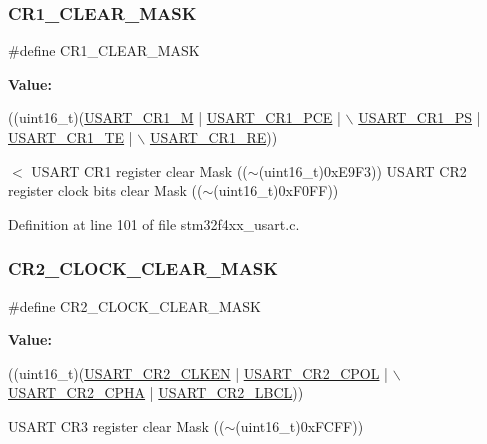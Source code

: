 \subsubsection{\texorpdfstring{C\+R1\+\_\+\+C\+L\+E\+A\+R\+\_\+\+M\+A\+SK}{CR1\_CLEAR\_MASK}}
{\footnotesize\ttfamily \#define C\+R1\+\_\+\+C\+L\+E\+A\+R\+\_\+\+M\+A\+SK}

{\bfseries Value\+:}
\begin{DoxyCode}
((uint16\_t)(\hyperlink{group___peripheral___registers___bits___definition_ga95f0288b9c6aaeca7cb6550a2e6833e2}{USART\_CR1\_M} | \hyperlink{group___peripheral___registers___bits___definition_ga60f8fcf084f9a8514efafb617c70b074}{USART\_CR1\_PCE} | \(\backslash\)
                                              \hyperlink{group___peripheral___registers___bits___definition_ga2e159d36ab2c93a2c1942df60e9eebbe}{USART\_CR1\_PS} | 
      \hyperlink{group___peripheral___registers___bits___definition_gade7f090b04fd78b755b43357ecaa9622}{USART\_CR1\_TE} | \(\backslash\)
                                              \hyperlink{group___peripheral___registers___bits___definition_gada0d5d407a22264de847bc1b40a17aeb}{USART\_CR1\_RE}))
\end{DoxyCode}
$<$ U\+S\+A\+RT C\+R1 register clear Mask (($\sim$(uint16\+\_\+t)0x\+E9\+F3)) U\+S\+A\+RT C\+R2 register clock bits clear Mask (($\sim$(uint16\+\_\+t)0x\+F0\+FF)) 

Definition at line 101 of file stm32f4xx\+\_\+usart.\+c.

\mbox{\label{group___u_s_a_r_t_ga7834b3d9be4875de242f87c12fd79f02}} 
\subsubsection{\texorpdfstring{C\+R2\+\_\+\+C\+L\+O\+C\+K\+\_\+\+C\+L\+E\+A\+R\+\_\+\+M\+A\+SK}{CR2\_CLOCK\_CLEAR\_MASK}}
{\footnotesize\ttfamily \#define C\+R2\+\_\+\+C\+L\+O\+C\+K\+\_\+\+C\+L\+E\+A\+R\+\_\+\+M\+A\+SK}

{\bfseries Value\+:}
\begin{DoxyCode}
((uint16\_t)(\hyperlink{group___peripheral___registers___bits___definition_ga42a396cde02ffa0c4d3fd9817b6af853}{USART\_CR2\_CLKEN} | \hyperlink{group___peripheral___registers___bits___definition_gafbb4336ac93d94d4e78f9fb7b3a0dc68}{USART\_CR2\_CPOL} | \(\backslash\)
                                              \hyperlink{group___peripheral___registers___bits___definition_ga362976ce813e58310399d113d2cf09cb}{USART\_CR2\_CPHA} | 
      \hyperlink{group___peripheral___registers___bits___definition_ga4a62e93ae7864e89622bdd92508b615e}{USART\_CR2\_LBCL}))
\end{DoxyCode}
U\+S\+A\+RT C\+R3 register clear Mask (($\sim$(uint16\+\_\+t)0x\+F\+C\+FF)) 

